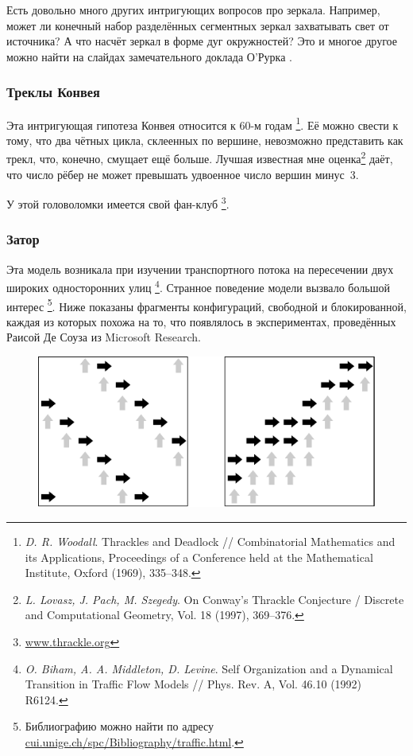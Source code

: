 \documentclass[twoside]{book}
\begin{document}
Есть довольно много других интригующих вопросов про зеркала.
Например, может ли конечный набор разделённых сегментных зеркал захватывать свет от источника?
А что насчёт зеркал в форме дуг окружностей?
Это и многое другое можно найти на слайдах замечательного доклада О’Рурка%
.

\subsubsection*{Треклы Конвея}

Эта интригующая гипотеза Конвея относится к 60-м годам%
\footnote{\emph{D. R. Woodall}. Thrackles and Deadlock /\!/ {Combinatorial Mathematics and its Appli\-ca\-tions}, Proceedings of a Conference held at the Mathematical Institute, Oxford (1969), 335--348.}.
Её можно свести к тому, что два чётных цикла, склеенных по вершине, невозможно представить как трекл,
что, конечно, смущает ещё больше.
Лучшая известная мне оценка\footnote{\emph{L. Lovasz, J. Pach, M. Szegedy}. On Conway's Thrackle Conjecture /\! {Discrete and Compu\-ta\-tional Geometry}, Vol. 18 (1997), 369--376.} даёт, что число рёбер не может превышать удвоенное число вершин минус~3.%


У этой головоломки имеется свой фан-клуб%
\footnote{\href{http://www.thrackle.org}{\url{www.thrackle.org}}}.

\subsubsection*{Затор}

Эта модель возникала при изучении транспортного потока на пересечении двух широких односторонних улиц%
\footnote{\emph{O. Biham, A. A. Middleton, D. Levine}. Self Organization and a Dynamical Transition in Traffic Flow Models /\!/ {Phys. Rev. A}, Vol. 46.10 (1992) R6124.}.
Странное поведение модели вызвало большой интерес%
\footnote{Библиографию можно найти по адресу \href{http://cui.unige.ch/spc/Bibliography/traffic.html.}{\url{cui.unige.ch/spc/Bibliography/traffic.html}}.}.
Ниже показаны фрагменты конфигураций, свободной и блокированной, каждая из которых похожа на то, что появлялось в экспериментах, проведённых Раисой Де Соуза из Microsoft Research.

\begin{figure}[!ht]
\centering
\includegraphics{mp/wink-32}
\end{figure}
\end{document}
